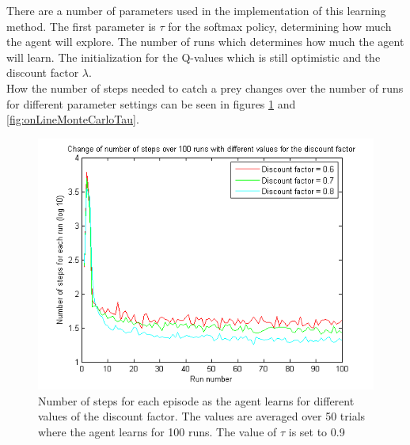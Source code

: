 \documentclass{article}
\begin{document}
There are a number of parameters used in the implementation of this learning method. The first parameter is $\tau$ for the softmax policy, determining how much the agent will explore. The number of runs which determines how much the agent will learn. The initialization for the Q-values which is still optimistic and the discount factor $\lambda$.\\  

How the number of steps needed to catch a prey changes over the number of runs for different parameter settings can be seen in figures \ref{fig:onLineMonteCarloDiscount} and \ref{fig:onLineMonteCarloTau}. 

\begin{figure}
\centering
\caption{Number of steps for each episode as the agent learns for different values of the discount factor. The values are averaged over 50 trials where the agent learns for 100 runs. The value of $\tau$ is set to 0.9}
\label{fig:onLineMonteCarloDiscount}
\includegraphics[scale=0.8]{averagesInOneFig_online_discountFact.png}
\end{figure}
\end{document}
